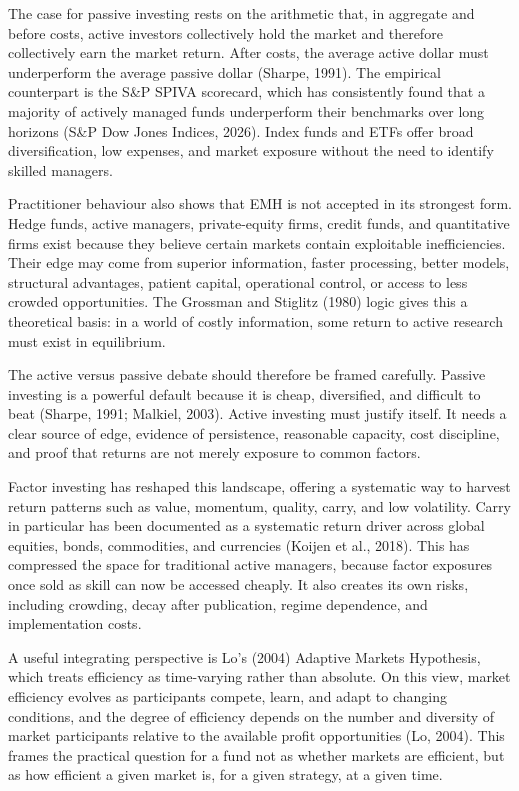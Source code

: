 \documentclass[11pt,a4paper]{article}
\begin{document}
The case for passive investing rests on the arithmetic that, in aggregate and before costs, active investors collectively hold the market and therefore collectively earn the market return. After costs, the average active dollar must underperform the average passive dollar (Sharpe, 1991). The empirical counterpart is the S\&P SPIVA scorecard, which has consistently found that a majority of actively managed funds underperform their benchmarks over long horizons (S\&P Dow Jones Indices, 2026). Index funds and ETFs offer broad diversification, low expenses, and market exposure without the need to identify skilled managers.

Practitioner behaviour also shows that EMH is not accepted in its strongest form. Hedge funds, active managers, private-equity firms, credit funds, and quantitative firms exist because they believe certain markets contain exploitable inefficiencies. Their edge may come from superior information, faster processing, better models, structural advantages, patient capital, operational control, or access to less crowded opportunities. The Grossman and Stiglitz (1980) logic gives this a theoretical basis: in a world of costly information, some return to active research must exist in equilibrium.

The active versus passive debate should therefore be framed carefully. Passive investing is a powerful default because it is cheap, diversified, and difficult to beat (Sharpe, 1991; Malkiel, 2003). Active investing must justify itself. It needs a clear source of edge, evidence of persistence, reasonable capacity, cost discipline, and proof that returns are not merely exposure to common factors.

Factor investing has reshaped this landscape, offering a systematic way to harvest return patterns such as value, momentum, quality, carry, and low volatility. Carry in particular has been documented as a systematic return driver across global equities, bonds, commodities, and currencies (Koijen et al., 2018). This has compressed the space for traditional active managers, because factor exposures once sold as skill can now be accessed cheaply. It also creates its own risks, including crowding, decay after publication, regime dependence, and implementation costs.

A useful integrating perspective is Lo's (2004) Adaptive Markets Hypothesis, which treats efficiency as time-varying rather than absolute. On this view, market efficiency evolves as participants compete, learn, and adapt to changing conditions, and the degree of efficiency depends on the number and diversity of market participants relative to the available profit opportunities (Lo, 2004). This frames the practical question for a fund not as whether markets are efficient, but as how efficient a given market is, for a given strategy, at a given time.
\end{document}
